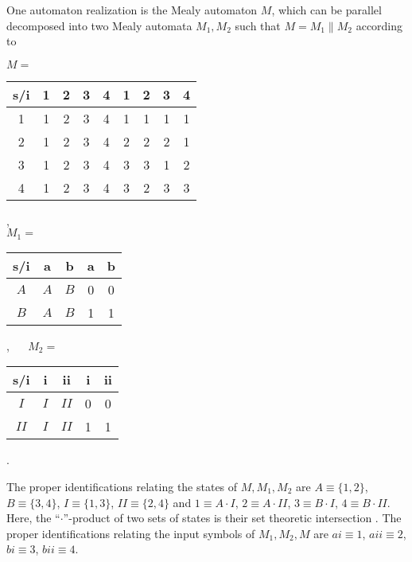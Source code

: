 

 One automaton realization is the Mealy automaton $M$, which can be
 parallel decomposed into two Mealy automata $M_1, M_2$ such that
 $M=M_1 \| M_2$ according to
\begin{center}
$M=$
\begin{tabular}{|c|cccc||cccc|}
 \hline
s/i &1&2&3&4 & 1&2&3&4\\
 \hline
1&1&2&3&4 & 1&1&1&1\\
2&1&2&3&4 & 2&2&2&1\\
3&1&2&3&4 & 3&3&1&2\\
4&1&2&3&4 & 3&2&3&3\\
 \hline
\end{tabular}
,\\
$\,$\\
$M_1=$
\begin{tabular}{|c|cc||cc|}
 \hline
s/i &a&b & a&b\\
 \hline
$A$&$A$&$B$ & 0&0\\
$B$&$A$&$B$ & 1&1\\
 \hline
\end{tabular}
,  $\quad$
$M_2=$
\begin{tabular}{|c|cc||cc|}
 \hline
s/i &i&ii& i&ii\\
 \hline
$I$&$I$&$II$ & 0&0\\
$II$&$I$&$II$ & 1&1\\
 \hline
\end{tabular}
.
\end{center}
The proper identifications relating the states of $M,M_1,M_2$ are
$A\equiv \{1,2\}$,
$B\equiv \{3,4\}$,
$I\equiv \{1,3\}$,
$II\equiv \{2,4\}$ and
$1\equiv A\cdot I$,
$2\equiv A\cdot II$,
$3\equiv B\cdot I$,
$4\equiv B\cdot II$.
Here, the ``$\cdot$''-product of two sets of states is their set
theoretic intersection
\cite[p. 4,5]{hartmanis}.
The proper identifications relating the input symbols of $M_1,M_2,M$ are
$ai\equiv 1$,
$aii\equiv 2$,
$bi\equiv 3$,
$bii\equiv 4$.

